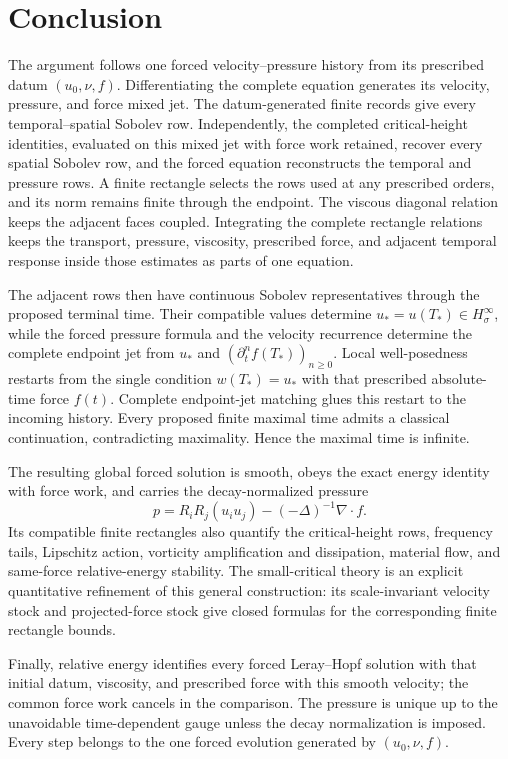 \clearpage
\section{Conclusion}

The argument follows one forced velocity--pressure history from its prescribed
datum \((u_0,\nu,f)\). Differentiating the complete equation generates its
velocity, pressure, and force mixed jet.  The datum-generated finite records
give every temporal--spatial Sobolev row.  Independently, the completed
critical-height identities, evaluated on this mixed jet with force work
retained, recover every spatial Sobolev row, and the forced equation
reconstructs the temporal and pressure rows.  A finite rectangle selects the rows used
at any prescribed orders, and its norm remains finite through the endpoint.
The viscous diagonal relation keeps the adjacent faces coupled.  Integrating
the complete rectangle relations keeps the transport, pressure, viscosity,
prescribed force, and adjacent temporal response inside those estimates
as parts of one equation.

The adjacent rows then have continuous Sobolev representatives through the
proposed terminal time.  Their compatible values determine
\(u_*=u(T_*)\in H^\infty_\sigma\), while the forced pressure formula and the
velocity recurrence determine the complete endpoint jet from \(u_*\) and
\((\partial_t^nf(T_*))_{n\ge0}\).  Local well-posedness restarts from the
single condition \(w(T_*)=u_*\) with that prescribed absolute-time force
\(f(t)\).  Complete endpoint-jet matching glues this restart to the incoming
history.  Every proposed finite
maximal time admits a classical continuation, contradicting
maximality. Hence the maximal time is infinite.

The resulting global forced solution is smooth, obeys the exact energy
identity with force work, and carries the decay-normalized pressure
\[
 p=R_iR_j(u_i u_j)-(-\Delta)^{-1}\nabla\cdot f.
\]
Its compatible finite rectangles also quantify the critical-height rows, frequency
tails, Lipschitz action, vorticity amplification and dissipation, material
flow, and same-force relative-energy stability.  The small-critical theory is
an explicit quantitative refinement of this general construction: its
scale-invariant velocity stock and projected-force stock give closed formulas
for the corresponding finite rectangle bounds.

Finally, relative energy identifies every forced Leray--Hopf solution with that initial datum, viscosity, and prescribed force with this smooth velocity;
the common force work cancels in the comparison.  The pressure is unique up to
the unavoidable time-dependent gauge unless the decay normalization is
imposed.  Every step belongs to the one forced evolution generated by
\((u_0,\nu,f)\).
